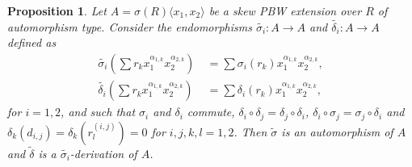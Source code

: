 \documentclass{amsart}
\newtheorem{proposition}[theorem]{Proposition}
\theoremstyle{definition}
\theoremstyle{remark}
\numberwithin{equation}{section}
\begin{document}
\begin{proposition}\label{extaautoSPBW2}
Let $A=\sigma(R)\langle x_1, x_2 \rangle$ be a skew PBW extension over $R$ of automorphism type. Consider the endomorphisms $\widetilde{\sigma_i}:A \rightarrow A$ and $\widetilde{\delta_i}:A\rightarrow A$ defined as
\begin{align*}
    \widetilde{\sigma_i}\left(\sum r_kx_1^{\alpha_{1,k}}x_2^{\alpha_{2,k}}\right) &\ = \sum \sigma_i(r_k)x_1^{\alpha_{1,k}}x_2^{\alpha_{2,k}}, \\ \widetilde{\delta_i}\left(\sum r_kx_1^{\alpha_{1,k}}x_2^{\alpha_{2,k}}\right) &\ = \sum \delta_i(r_k)x_1^{\alpha_{1,k}}x_2^{\alpha_{2,k}},
\end{align*}
for $i= 1, 2$, and such that $\sigma_i$ and $\delta_i$ commute, $\delta_i\circ\delta_j=\delta_j\circ\delta_i$, $\delta_i\circ\sigma_j=\sigma_j\circ\delta_i$ and $\delta_k(d_{i,j})=\delta_k(r_l^{(i,j)})=0$ for $i, j, k, l= 1, 2$. Then $\widetilde{\sigma}$ is an automorphism of $A$ and $\widetilde{\delta}$ is a $\widetilde{\sigma_i}$-derivation of $A$.
\end{proposition}
\end{document}
